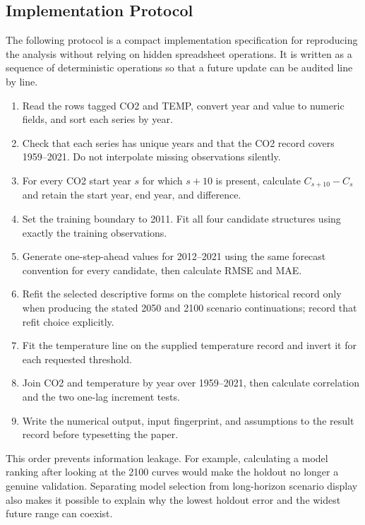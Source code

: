 \documentclass{mcmthesis}
\begin{document}
\begin{appendices}
\section{Implementation Protocol}
The following protocol is a compact implementation specification for reproducing the analysis without relying on hidden spreadsheet operations. It is written as a sequence of deterministic operations so that a future update can be audited line by line.

\begin{enumerate}
\item Read the rows tagged CO2 and TEMP, convert year and value to numeric fields, and sort each series by year.
\item Check that each series has unique years and that the CO2 record covers 1959--2021. Do not interpolate missing observations silently.
\item For every CO2 start year $s$ for which $s+10$ is present, calculate $C_{s+10}-C_s$ and retain the start year, end year, and difference.
\item Set the training boundary to 2011. Fit all four candidate structures using exactly the training observations.
\item Generate one-step-ahead values for 2012--2021 using the same forecast convention for every candidate, then calculate RMSE and MAE.
\item Refit the selected descriptive forms on the complete historical record only when producing the stated 2050 and 2100 scenario continuations; record that refit choice explicitly.
\item Fit the temperature line on the supplied temperature record and invert it for each requested threshold.
\item Join CO2 and temperature by year over 1959--2021, then calculate correlation and the two one-lag increment tests.
\item Write the numerical output, input fingerprint, and assumptions to the result record before typesetting the paper.
\end{enumerate}

This order prevents information leakage. For example, calculating a model ranking after looking at the 2100 curves would make the holdout no longer a genuine validation. Separating model selection from long-horizon scenario display also makes it possible to explain why the lowest holdout error and the widest future range can coexist.


\end{appendices}
\end{document}
